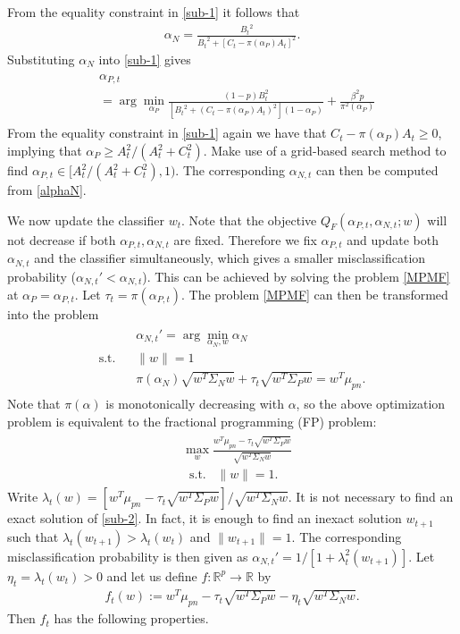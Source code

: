 \documentclass[15pt]{article}
\newcommand{\R}{{\mathbb R}}
\newcommand{\be}{\begin{eqnarray}}
\newcommand{\ben}{\begin{eqnarray*}}
\newcommand{\en}{\end{eqnarray}}
\newcommand{\enn}{\end{eqnarray*}}
\begin{document}
From the equality constraint in \eqref{sub-1} it follows that
\be\label{alphaN}
\alpha_N=\frac{{B_t}^2}{{B_t}^2+\left[C_t-\pi(\alpha_P)A_t\right]^2}.
\en
Substituting $\alpha_N$ into \eqref{sub-1} gives 
\begin{align}\label{solution-1}
\begin{split}
&\alpha_{P,t}\\
&=\arg\min_{\alpha_P}\frac{(1-p)B_t^2}{[{B_t}^2+(C_t-\pi(\alpha_P)A_t)^2](1-\alpha_P)}
+\frac{\beta^2 p}{\pi^2(\alpha_P)}
\end{split}
\end{align}
From the equality constraint in \eqref{sub-1} again we have that $C_t-\pi(\alpha_P)A_t\ge0$,
implying that $\alpha_P\ge{A_t^2}/({A_t^2+C_t^2})$.
Make use of a grid-based search method to find $\alpha_{P,t}\in[{A_t^2}/({A_t^2+C_t^2}),1)$.
The corresponding $\alpha_{N,t}$ can then be computed from \eqref{alphaN}.

We now update the classifier $w_t$. Note that the objective $Q_F(\alpha_{P,t},\alpha_{N,t};w)$ will not
decrease if both $\alpha_{P,t},\alpha_{N,t}$ are fixed. Therefore we fix $\alpha_{P,t}$ and update
both $\alpha_{N,t}$ and the classifier simultaneously, which gives a smaller misclassification
probability ($\alpha_{N,t}'<\alpha_{N,t}$).
This can be achieved by solving the problem \eqref{MPMF} at $\alpha_P=\alpha_{P,t}$.
Let $\tau_t=\pi(\alpha_{P,t})$. The problem \eqref{MPMF} can then be transformed into the problem
\begin{align*}
\begin{split}
&\alpha_{N,t}'=\arg\min_{\alpha_N, w}\alpha_N\\
\text{s.t.}\;\;\;&\|w\|=1 \\
&\pi(\alpha_N)\sqrt{w^T\Sigma_N w}+\tau_t\sqrt{w^T\Sigma_P w}=w^T\mu_{pn}.
\end{split}
\end{align*}
Note that $\pi(\alpha)$ is monotonically decreasing with $\alpha$, so the above optimization problem is 
equivalent to the fractional programming (FP) problem:
\begin{align}\label{sub-2}
\begin{split}
&\max_{w}\frac{w^T\mu_{pn}-\tau_t\sqrt{w^T\Sigma_P w}}{\sqrt{w^T\Sigma_N w}}\\
&\;\;\text{s.t.}\;\;\;\|w\|= 1.
\end{split}
\end{align}
Write $\lambda_{t}(w)=[w^T\mu_{pn}-\tau_t\sqrt{w^T\Sigma_P w}]/{\sqrt{w^T\Sigma_N w}}$.
It is not necessary to find an exact solution of \eqref{sub-2}. In fact, it is enough to find an inexact
solution $w_{t+1}$ such that $\lambda_{t}(w_{t+1})>\lambda_{t}(w_{t})$ and $\|w_{t+1}\|=1$.
The corresponding misclassification probability is then given as
$\alpha_{N,t}'={1}/[{1+\lambda_t^2(w_{t+1})}]$. Let $\eta_{t}=\lambda_{t}(w_{t})>0$ and let us
define $f:\R^p\to\R$ by
\ben
f_{t}(w):=w^T\mu_{pn}-\tau_t\sqrt{w^T\Sigma_P w}-\eta_{t}\sqrt{w^T\Sigma_N w}.
\enn
Then $f_t$ has the following properties.
\end{document}
